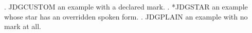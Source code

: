 
\DeclareJudgment[spoken={marginal for me}]{\marginal}{\%\%}

\ex. \marginal JDGCUSTOM an example with a declared mark.
\ex. *JDGSTAR an example whose star has an overridden spoken form.
\ex. JDGPLAIN an example with no mark at all.

